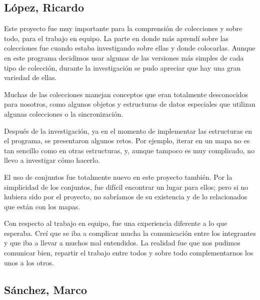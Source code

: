 \documentclass[11pt]{article}
\begin{document}
\subsection{López, Ricardo}

\par

Este proyecto fue muy importante para la comprensión de colecciones y 
sobre todo, para el trabajo en equipo. La parte en donde más aprendí 
sobre las colecciones fue cuando estaba investigando sobre ellas y 
donde colocarlas. Aunque en este programa decidimos usar algunas de 
las versiones más simples de cada tipo de colección, durante la 
investigación se pudo apreciar que hay una gran variedad de ellas.

\par

Muchas de las colecciones manejan conceptos que eran totalmente 
desconocidos para nosotros, como algunos objetos y estructuras de 
datos especiales que utilizan algunas colecciones o la 
sincronización.

\par

Después de la investigación, ya en el momento de implementar las 
estructuras en el programa, se presentaron algunos retos. Por 
ejemplo, iterar en un mapa no es tan sencillo como en otras 
estructuras, y, aunque tampoco es muy complicado, no llevo a 
investigar cómo hacerlo.

\par

El uso de conjuntos fue totalmente nuevo en este proyecto también. 
Por la simplicidad de los conjuntos, fue difícil encontrar un lugar 
para ellos; pero si no hubiera sido por el proyecto, no sabríamos de 
su existencia y de lo relacionados que están con los mapas.

\par

Con respecto al trabajo en equipo, fue una experiencia diferente a lo 
que esperaba. Creí que se iba a complicar mucha la comunicación entre 
los integrantes y que iba a llevar a muchos mal entendidos. La 
realidad fue que nos pudimos comunicar bien, repartir el trabajo 
entre todos y sobre todo complementarnos los unos a los otros. 

\subsection{Sánchez, Marco}

\par
\end{document}
